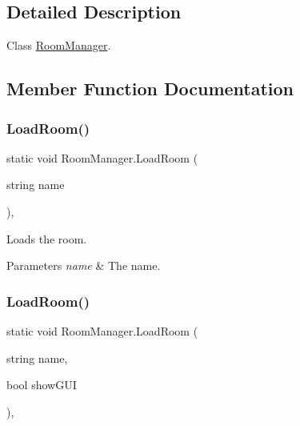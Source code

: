 \subsection{Detailed Description}
Class \hyperlink{class_room_manager}{Room\+Manager}. 



\subsection{Member Function Documentation}
\mbox{\label{class_room_manager_ae4dc2875ec849f36ad84b3b5fadb3b9e}} 
\subsubsection{\texorpdfstring{Load\+Room()}{LoadRoom()}\hspace{0.1cm}{\footnotesize\ttfamily [1/2]}}
{\footnotesize\ttfamily static void Room\+Manager.\+Load\+Room (\begin{DoxyParamCaption}\item[{string}]{name }\end{DoxyParamCaption})\hspace{0.3cm}{\ttfamily [inline]}, {\ttfamily [static]}}



Loads the room. 


\begin{DoxyParams}{Parameters}
{\em name} & The name.\\
\hline
\end{DoxyParams}
\mbox{\label{class_room_manager_a984b27dbc036e5c218a194bed0a96e79}} 
\subsubsection{\texorpdfstring{Load\+Room()}{LoadRoom()}\hspace{0.1cm}{\footnotesize\ttfamily [2/2]}}
{\footnotesize\ttfamily static void Room\+Manager.\+Load\+Room (\begin{DoxyParamCaption}\item[{string}]{name,  }\item[{bool}]{show\+G\+UI }\end{DoxyParamCaption})\hspace{0.3cm}{\ttfamily [inline]}, {\ttfamily [static]}}



